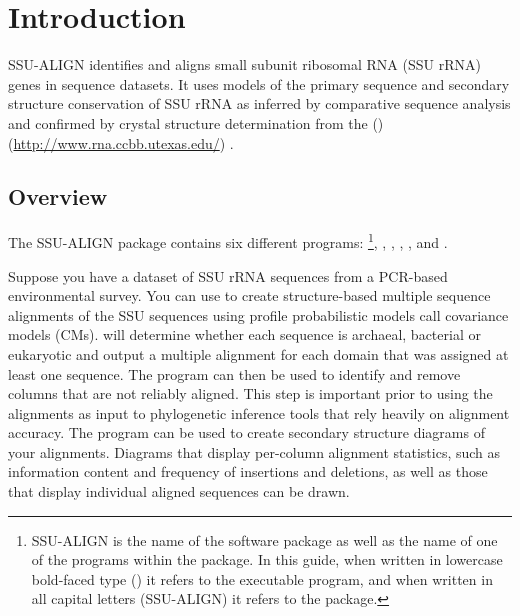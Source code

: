\section{Introduction}

SSU-ALIGN identifies and aligns small subunit ribosomal RNA
(SSU rRNA) genes in sequence datasets. It uses models of the primary
sequence and secondary structure conservation of SSU rRNA as inferred
by comparative sequence analysis and confirmed by crystal structure
determination from the  () 
(\url{http://www.rna.ccbb.utexas.edu/})
\cite{CannoneGutell02}.

\subsection{Overview}
The SSU-ALIGN package contains six different
programs: \footnote{SSU-ALIGN is the name of the
  software package as well as the name of one of the programs within
  the package. In this guide, when written in lowercase bold-faced
  type () it refers to the executable program, and
  when written in all capital letters (SSU-ALIGN) it refers to
  the package.},
, , 
, , and . 

Suppose you have a dataset of SSU rRNA sequences from a PCR-based
environmental survey. You can use  to create
structure-based multiple sequence alignments of the
SSU sequences using profile probabilistic models call covariance
models (CMs).  will determine whether each sequence
is archaeal, bacterial or eukaryotic and output a multiple alignment
for each domain that was assigned at least one sequence. 
The  program can then be used to identify and remove
columns that are not reliably aligned. This step is important prior to using the
alignments as input to phylogenetic inference tools that rely heavily
on alignment accuracy.  
The  program can be used to create secondary
structure diagrams of your alignments. Diagrams that display per-column
alignment statistics, such as information content and frequency of
insertions and deletions, as well as those that display individual
aligned sequences can be drawn.

